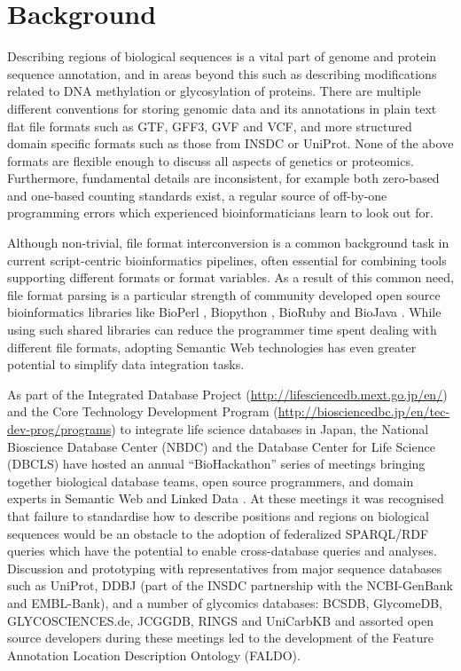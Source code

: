\section*{Background}
Describing regions of biological sequences is a vital part of genome and protein sequence
annotation, and in areas beyond this such as describing modifications related to DNA methylation
or glycosylation of proteins.
There are multiple different conventions for storing genomic data and its annotations in
plain text flat file formats such as GTF, GFF3, GVF and VCF,
and more structured domain specific formats such as those from INSDC or UniProt.
None of the above formats are flexible enough to discuss all aspects of genetics or proteomics. 
Furthermore, fundamental details are inconsistent, for example both zero-based and
one-based counting standards exist, a regular source of off-by-one programming
errors which experienced bioinformaticians learn to look out for.

Although non-trivial, file format interconversion is a common background task
in current script-centric bioinformatics pipelines, often essential for combining
tools supporting different formats or format variables.
As a result of this common need, file format parsing is a particular strength of
community developed open source bioinformatics libraries like BioPerl
\cite{BioPerl2002}, Biopython \cite{Biopython2009}, BioRuby \cite{BioRuby2010}
and BioJava \cite{BioJava2012}. While using such shared libraries can reduce the
programmer time spent dealing with different file formats, adopting Semantic
Web technologies has even greater potential to simplify data integration tasks.

As part of the Integrated Database Project (\url{http://lifesciencedb.mext.go.jp/en/}) and
the Core Technology Development Program (\url{http://biosciencedbc.jp/en/tec-dev-prog/programs})
to integrate life science databases in Japan, the National Bioscience Database Center (NBDC) and the Database
Center for Life Science (DBCLS) have hosted an annual ``BioHackathon'' series
of meetings bringing together biological database teams, open source programmers,
and domain experts in Semantic Web and Linked Data \cite{BioHack2010,BioHack2011and2012}.
At these meetings it was recognised that failure to standardise how to describe positions
and regions on biological sequences would be an obstacle to the adoption of federalized
SPARQL/RDF queries which have the potential to enable cross-database queries and
analyses. Discussion and prototyping with representatives from major sequence databases
such as UniProt\cite{UniProt2013}, DDBJ\cite{DDBJ2013} (part of the INSDC partnership with the NCBI-GenBank\cite{GenBank2013} and EMBL-Bank\cite{ENA2013}),
and a number of glycomics databases: 
BCSDB\cite{doi:10.1021/ci100150d}, GlycomeDB\cite{Ranzinger01012011}, GLYCOSCIENCES.de\cite{Lutteke01052006}, JCGGDB, RINGS\cite{RINGS} and UniCarbKB\cite{UniCarbKB} and assorted open source developers during these meetings
led to the development of the Feature Annotation Location Description Ontology (FALDO).

